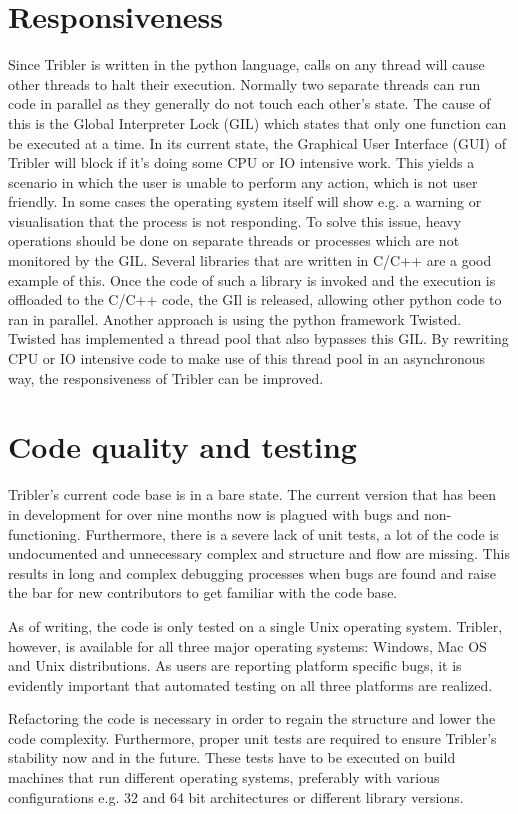 \section{Responsiveness}
Since Tribler is written in the python language, calls on any thread will cause other threads to halt their execution.
Normally two separate threads can run code in parallel as they generally do not touch each other's state.
The cause of this is the Global Interpreter Lock (GIL) which states that only one function can be executed at a time.
In its current state, the Graphical User Interface (GUI) of Tribler will block if it's doing some CPU or IO intensive work.
This yields a scenario in which the user is unable to perform any action, which is not user friendly.
In some cases the operating system itself will show e.g. a warning or visualisation that the process is not responding.
To solve this issue, heavy operations should be done on separate threads or processes which are not monitored by the GIL.
Several libraries that are written in C/C++ are a good example of this.
Once the code of such a library is invoked and the execution is offloaded to the C/C++ code, the GIl is released, allowing other python code to ran in parallel.
Another approach is using the python framework Twisted.
Twisted has implemented a thread pool that also bypasses this GIL.
By rewriting CPU or IO intensive code to make use of this thread pool in an asynchronous way, the responsiveness of Tribler can be improved.

\section{Code quality and testing}
Tribler's current code base is in a bare state.
The current version that has been in development for over nine months now is plagued with bugs and non-functioning.
Furthermore, there is a severe lack of unit tests, a lot of the code is undocumented and unnecessary complex and structure and flow are missing.
This results in long and complex debugging processes when bugs are found and raise the bar for new contributors to get familiar with the code base.

As of writing, the code is only tested on a single Unix operating system.
Tribler, however, is available for all three major operating systems: Windows, Mac OS and Unix distributions.
As users are reporting platform specific bugs, it is evidently important that automated testing on all three platforms are realized.

Refactoring the code is necessary in order to regain the structure and lower the code complexity.
Furthermore, proper unit tests are required to ensure Tribler's stability now and in the future.
These tests have to be executed on build machines that run different operating systems, preferably with various configurations e.g. 32 and 64 bit architectures or different library versions.
